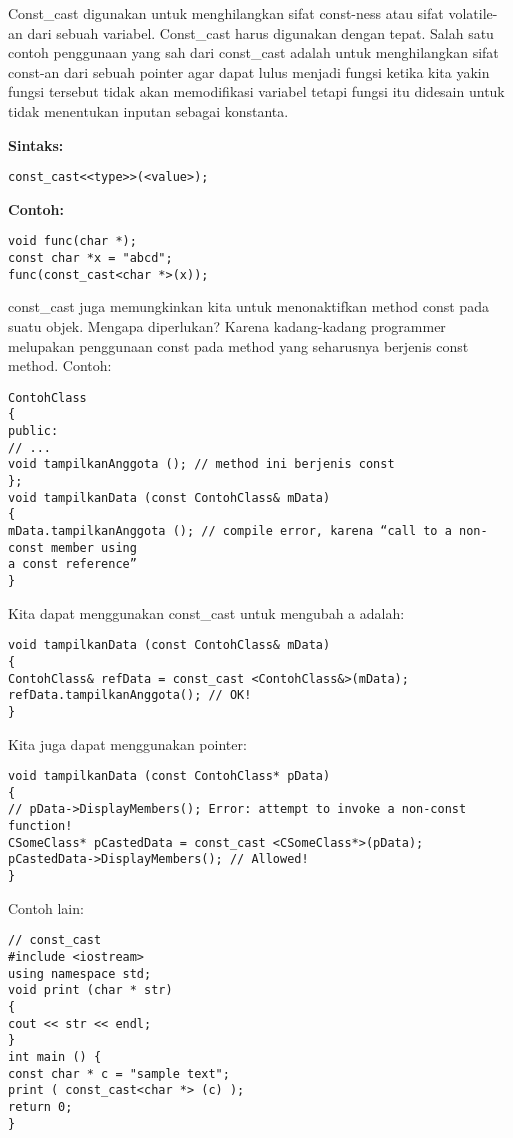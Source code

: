 Const\_cast digunakan untuk menghilangkan sifat const-ness atau sifat
volatile-an dari sebuah variabel. Const\_cast harus digunakan dengan
tepat. Salah satu contoh penggunaan yang sah dari const\_cast adalah
untuk menghilangkan sifat const-an dari sebuah pointer agar dapat lulus
menjadi fungsi ketika kita yakin fungsi tersebut tidak akan memodifikasi
variabel tetapi fungsi itu didesain untuk tidak menentukan inputan
sebagai konstanta.

\textbf{Sintaks:}

\begin{verbatim}
const_cast<<type>>(<value>);
\end{verbatim}

\textbf{Contoh:}

\begin{verbatim}
void func(char *);
const char *x = "abcd";
func(const_cast<char *>(x));
\end{verbatim}

const\_cast juga memungkinkan kita untuk menonaktifkan method const pada
suatu objek. Mengapa diperlukan? Karena kadang-kadang programmer
melupakan penggunaan const pada method yang seharusnya berjenis const
method. Contoh:

\begin{verbatim}
ContohClass
{
public:
// ...
void tampilkanAnggota (); // method ini berjenis const
};
void tampilkanData (const ContohClass& mData)
{
mData.tampilkanAnggota (); // compile error, karena “call to a non-const member using
a const reference”
}
\end{verbatim}

Kita dapat menggunakan const\_cast untuk mengubah a adalah:

\begin{verbatim}
void tampilkanData (const ContohClass& mData)
{
ContohClass& refData = const_cast <ContohClass&>(mData);
refData.tampilkanAnggota(); // OK!
}
\end{verbatim}

Kita juga dapat menggunakan pointer:

\begin{verbatim}
void tampilkanData (const ContohClass* pData)
{
// pData->DisplayMembers(); Error: attempt to invoke a non-const function!
CSomeClass* pCastedData = const_cast <CSomeClass*>(pData);
pCastedData->DisplayMembers(); // Allowed!
}
\end{verbatim}

Contoh lain:

\begin{verbatim}
// const_cast
#include <iostream>
using namespace std;
void print (char * str)
{
cout << str << endl;
}
int main () {
const char * c = "sample text";
print ( const_cast<char *> (c) );
return 0;
}
\end{verbatim}

